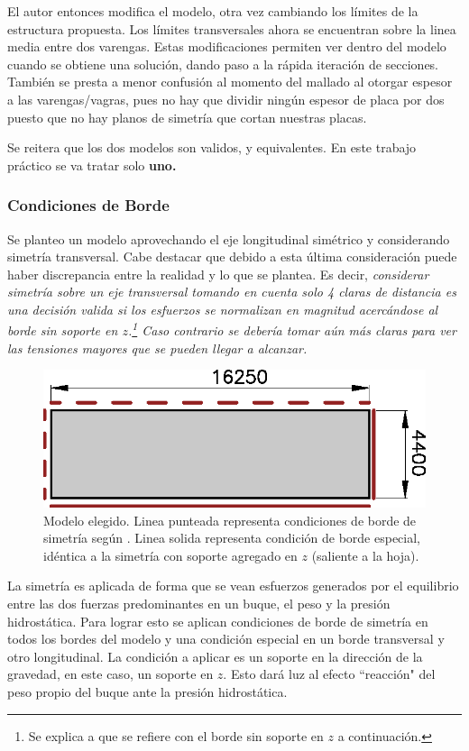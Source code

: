 \documentclass[onecolumn,10pt,titlepage]{article}
\begin{document}
El autor entonces modifica el modelo, otra vez cambiando los límites de la estructura propuesta. Los límites transversales ahora se encuentran sobre la linea media entre dos varengas. Estas modificaciones permiten ver dentro del modelo cuando se obtiene una solución, dando paso a la rápida iteración de secciones. También se presta a menor confusión al momento del mallado al otorgar espesor a las varengas/vagras, pues no hay que dividir ningún espesor de placa por dos \citep{cook2007concepts} puesto que no hay planos de simetría que cortan nuestras placas.

Se reitera que los dos modelos son validos, y equivalentes. En este trabajo práctico se va tratar solo \textbf{uno.}

\subsubsection*{Condiciones de Borde} 

Se planteo un modelo aprovechando el eje longitudinal simétrico y considerando simetría transversal. Cabe destacar que debido a esta última consideración puede haber discrepancia entre la realidad y lo que se plantea. Es decir, \emph{considerar simetría sobre un eje transversal tomando en cuenta solo 4 claras de distancia es una decisión valida si los esfuerzos se normalizan en magnitud acercándose al borde sin soporte en $z$.\footnote{Se explica a que se refiere con el borde sin soporte en $z$ a continuación.} Caso contrario se debería tomar aún más claras para ver las tensiones mayores que se pueden llegar a alcanzar.}

\begin{figure}[htb!]
	\centering
	\includegraphics[width=.6\textwidth]{fig/modelnx.eps}
	\caption{Modelo elegido. Linea punteada representa condiciones de borde de simetría según \citep{cook2007concepts}. Linea solida representa condición de borde especial, idéntica a la simetría con soporte agregado en $z$ (saliente a la hoja).}
\end{figure}


La simetría es aplicada de forma que se vean esfuerzos generados por el equilibrio entre las dos fuerzas predominantes en un buque, el peso y la presión hidrostática. Para lograr esto se aplican condiciones de borde de simetría en todos los bordes del modelo y una condición especial en un borde transversal y otro longitudinal. La condición a aplicar es un soporte en la dirección de la gravedad, en este caso, un soporte en $z$. Esto dará luz al efecto ``reacción"{} del peso propio del buque ante la presión hidrostática.
\end{document}
